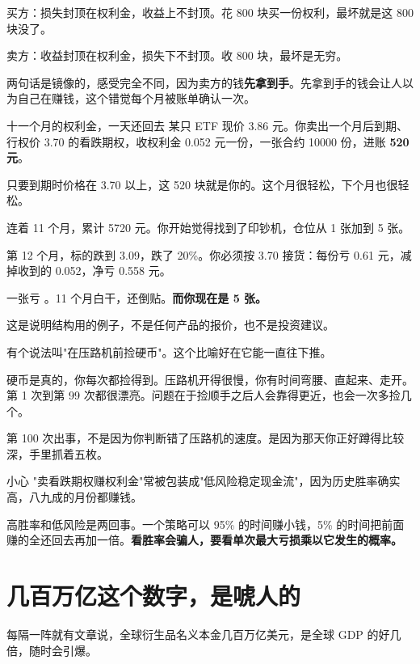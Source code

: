买方：损失封顶在权利金，收益上不封顶。花 800 块买一份权利，最坏就是这 800 块没了。

卖方：收益封顶在权利金，损失下不封顶。收 800 块，最坏是无穷。

两句话是镜像的，感受完全不同，因为卖方的钱\textbf{先拿到手}。先拿到手的钱会让人以为自己在赚钱，这个错觉每个月被账单确认一次。

\begin{egbox}{十一个月的权利金，一天还回去}
某只 ETF 现价 3.86 元。你卖出一个月后到期、行权价 3.70 的看跌期权，收权利金 0.052 元一份，一张合约 10000 份，进账 \textbf{520 元}。

只要到期时价格在 3.70 以上，这 520 块就是你的。这个月很轻松，下个月也很轻松。

连着 11 个月，累计 5720 元。你开始觉得找到了印钞机，仓位从 1 张加到 5 张。

第 12 个月，标的跌到 3.09，跌了 20\%。你必须按 3.70 接货：每份亏 0.61 元，减掉收到的 0.052，净亏 0.558 元。

一张亏 。11 个月白干，还倒贴。\textbf{而你现在是 5 张。}

这是说明结构用的例子，不是任何产品的报价，也不是投资建议。

\end{egbox}

有个说法叫"在压路机前捡硬币"。这个比喻好在它能一直往下推。

硬币是真的，你每次都捡得到。压路机开得很慢，你有时间弯腰、直起来、走开。第 1 次到第 99 次都很漂亮。问题在于捡顺手之后人会靠得更近，也会一次多捡几个。

第 100 次出事，不是因为你判断错了压路机的速度。是因为那天你正好蹲得比较深，手里抓着五枚。

\begin{warnbox}{小心}
"卖看跌期权赚权利金"常被包装成"低风险稳定现金流"，因为历史胜率确实高，八九成的月份都赚钱。

高胜率和低风险是两回事。一个策略可以 95\% 的时间赚小钱，5\% 的时间把前面赚的全还回去再加一倍。\textbf{看胜率会骗人，要看单次最大亏损乘以它发生的概率。}

\end{warnbox}

\section{几百万亿这个数字，是唬人的}

每隔一阵就有文章说，全球衍生品名义本金几百万亿美元，是全球 GDP 的好几倍，随时会引爆。

